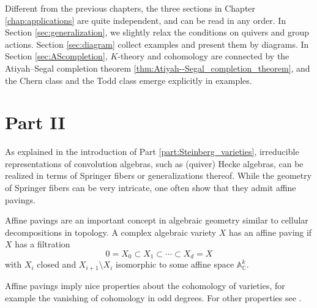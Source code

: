 Different from the previous chapters, the three sections in Chapter \ref{chap:applications} are quite independent, and can be read in any order. In Section \ref{sec:generalization}, we slightly relax the conditions on quivers and group actions. Section \ref{sec:diagram} collect examples and present them by diagrams. In Section \ref{sec:AScompletion}, $K$-theory and cohomology are connected by the Atiyah--Segal completion theorem \ref{thm:Atiyah--Segal_completion_theorem}, and the Chern class and the Todd class emerge explicitly in examples.

\section*{Part II}

As explained in the introduction of Part \ref{part:Steinberg_varieties}, irreducible representations of convolution algebras, such as (quiver) Hecke algebras, can be realized in terms of Springer fibers or generalizations thereof.
While the geometry of Springer fibers can be very intricate, one often show that they admit affine pavings.

Affine pavings are an important concept in algebraic geometry similar to cellular decompositions in topology. A complex algebraic variety $X$ has an affine paving if $X$ has a filtration
$$0= X_0 \subset X_1 \subset \cdots \subset X_d=X$$
with $X_i$ closed and $X_{i+1} \setminus X_i$ isomorphic to some affine space $\mathbb{A}^k_{\mathbb{C}}$.

Affine pavings imply nice properties about the cohomology of varieties, for example the vanishing of cohomology in odd degrees. For other properties see \cite[1.7]{de1988homology}.

